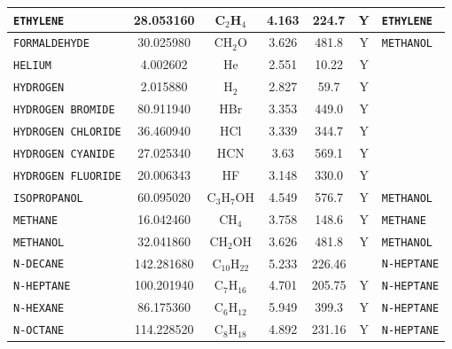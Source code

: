 \documentclass[11pt]{book}
\newcommand{\ct}{\tt\small}
\begin{document}
\begin{table}[p]
\begin{center}
\begin{tabular}{|l|c|c|c|c|c|l|}
{\ct ETHYLENE}           & 28.053160  & C$_2$H$_4$       & 4.163    & 224.7    &  Y       &  {\ct ETHYLENE}                 \\ \hline
{\ct FORMALDEHYDE}       & 30.025980  & CH$_2$O          & 3.626    & 481.8    &  Y       &  {\ct METHANOL}                 \\ \hline
{\ct HELIUM}             & 4.002602   & He               & 2.551    & 10.22    &  Y       &                                 \\ \hline
{\ct HYDROGEN}           & 2.015880   & H$_2$            & 2.827    & 59.7     &  Y       &                                 \\ \hline
{\ct HYDROGEN BROMIDE}   & 80.911940  & HBr              & 3.353    & 449.0    &  Y       &                                 \\ \hline
{\ct HYDROGEN CHLORIDE}  & 36.460940  & HCl              & 3.339    & 344.7    &  Y       &                                 \\ \hline
{\ct HYDROGEN CYANIDE}   & 27.025340  & HCN              & 3.63     & 569.1    &  Y       &                                 \\ \hline
{\ct HYDROGEN FLUORIDE}  & 20.006343  & HF               & 3.148    & 330.0    &  Y       &                                 \\ \hline
{\ct ISOPROPANOL}        & 60.095020  & C$_3$H$_7$OH     & 4.549    & 576.7    &  Y       &  {\ct METHANOL}                 \\ \hline
{\ct METHANE}            & 16.042460  & CH$_4$           & 3.758    & 148.6    &  Y       &  {\ct METHANE}                  \\ \hline
{\ct METHANOL}           & 32.041860  & CH$_2$OH         & 3.626    & 481.8    &  Y       &  {\ct METHANOL}                 \\ \hline
{\ct N-DECANE}           & 142.281680 & C$_{10}$H$_{22}$ & 5.233    & 226.46   &          &  {\ct N-HEPTANE}                \\ \hline
{\ct N-HEPTANE}          & 100.201940 & C$_7$H$_{16}$    & 4.701    & 205.75   &  Y       &  {\ct N-HEPTANE}                \\ \hline
{\ct N-HEXANE}           & 86.175360  & C$_6$H$_{12}$    & 5.949    & 399.3    &  Y       &  {\ct N-HEPTANE}                \\ \hline
{\ct N-OCTANE}           & 114.228520 & C$_8$H$_{18}$    & 4.892    & 231.16   &  Y       &  {\ct N-HEPTANE}                \\ \hline

\end{tabular}
\end{center}
\end{table}
\end{document}
